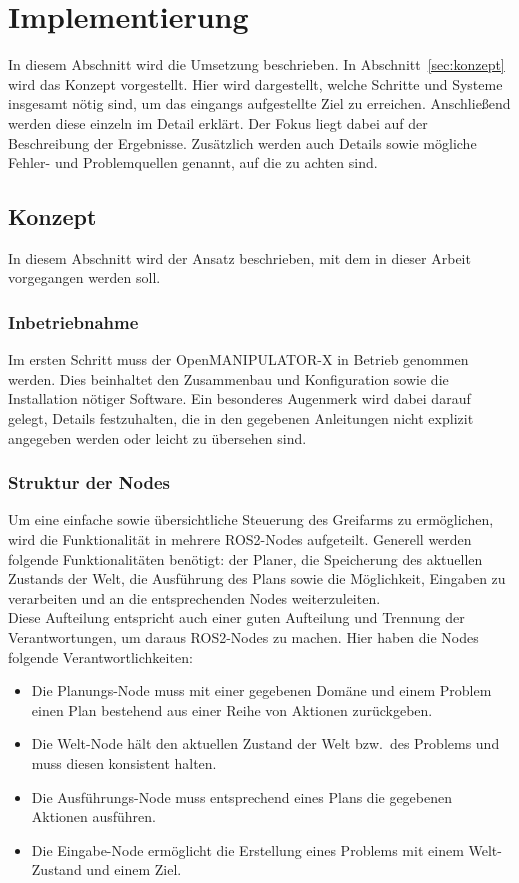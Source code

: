 \section{Implementierung}
In diesem Abschnitt wird die Umsetzung beschrieben.
In Abschnitt~\ref{sec:konzept} wird das Konzept vorgestellt.
Hier wird dargestellt, welche Schritte und Systeme insgesamt nötig sind, um das eingangs aufgestellte Ziel zu erreichen.
Anschließend werden diese einzeln im Detail erklärt.
Der Fokus liegt dabei auf der Beschreibung der Ergebnisse.
Zusätzlich werden auch Details sowie mögliche Fehler- und Problemquellen genannt, auf die zu achten sind.
\subsection{Konzept}{\label{sec:konzept}}
In diesem Abschnitt wird der Ansatz beschrieben, mit dem in dieser Arbeit vorgegangen werden soll.
\subsubsection{Inbetriebnahme}
Im ersten Schritt muss der OpenMANIPULATOR-X in Betrieb genommen werden.
Dies beinhaltet den Zusammenbau und Konfiguration sowie die Installation nötiger Software.
Ein besonderes Augenmerk wird dabei darauf gelegt, Details festzuhalten, die in den gegebenen Anleitungen nicht explizit angegeben werden oder leicht zu übersehen sind.
\subsubsection{Struktur der Nodes}{\label{konzept:nodes}}
Um eine einfache sowie übersichtliche Steuerung des Greifarms zu ermöglichen, wird die Funktionalität in mehrere \ac{ROS2}-Nodes aufgeteilt.
Generell werden folgende Funktionalitäten benötigt: der Planer, die Speicherung des aktuellen Zustands der Welt, die Ausführung des Plans sowie die Möglichkeit, Eingaben zu verarbeiten und an die entsprechenden Nodes weiterzuleiten.\\
Diese Aufteilung entspricht auch einer guten Aufteilung und Trennung der Verantwortungen, um daraus \ac{ROS2}-Nodes zu machen.
Hier haben die Nodes folgende Verantwortlichkeiten:\\
\begin{itemize}
    \item Die Planungs-Node muss mit einer gegebenen Domäne und einem Problem einen Plan bestehend aus einer Reihe von Aktionen zurückgeben.
    \item Die Welt-Node hält den aktuellen Zustand der Welt bzw.\ des Problems und muss diesen konsistent halten.
    \item Die Ausführungs-Node muss entsprechend eines Plans die gegebenen Aktionen ausführen.
    \item Die Eingabe-Node ermöglicht die Erstellung eines Problems mit einem Welt-Zustand und einem Ziel.
\end{itemize}
